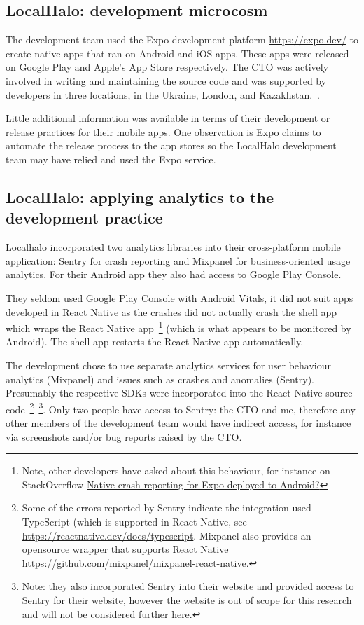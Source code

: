\subsection{LocalHalo: development microcosm}
The development team used the Expo development platform \url{https://expo.dev/} to create native apps that ran on Android and iOS apps. These apps were released on Google Play and Apple's App Store respectively. The CTO was actively involved in writing and maintaining the source code and was supported by developers in three locations, in the Ukraine, London, and Kazakhstan.~\citep{karpenko2019_localhalo_a_social_network_for_neighbors}. 

Little additional information was available in terms of their development or release practices for their mobile apps. One observation is Expo claims to automate the release process to the app stores so the LocalHalo development team may have relied and used the Expo service.

\subsection{LocalHalo: applying analytics to the development practice}
Localhalo incorporated two analytics libraries into their cross-platform mobile application: Sentry for crash reporting and Mixpanel for business-oriented usage analytics. For their Android app they also had access to Google Play Console.

They seldom used Google Play Console with Android Vitals, it did not suit apps developed in React Native as the crashes did not actually crash the shell app which wraps the React Native app~\footnote{Note, other developers have asked about this behaviour, for instance on StackOverflow \href{https://stackoverflow.com/questions/66166824/native-crash-reporting-for-expo-deployed-to-android/}{Native crash reporting for Expo deployed to Android?}} 
(which is what appears to be monitored by Android). The shell app restarts the React Native app automatically.

The development chose to use separate analytics services for user behaviour analytics (Mixpanel) and issues such as crashes and anomalies (Sentry). Presumably the respective SDKs were incorporated into the React Native source code~\footnote{Some of the errors reported by Sentry indicate the integration used TypeScript (which is supported in React Native, see \url{https://reactnative.dev/docs/typescript}. Mixpanel also provides an opensource wrapper that supports React Native \url{https://github.com/mixpanel/mixpanel-react-native}.}~\footnote{Note: they also incorporated Sentry into their website and provided access to Sentry for their website, however the website is out of scope for this research and will not be considered further here.}. Only two people have access to Sentry: the CTO and me, therefore any other members of the development team would have indirect access, for instance via screenshots and/or bug reports raised by the CTO. 

